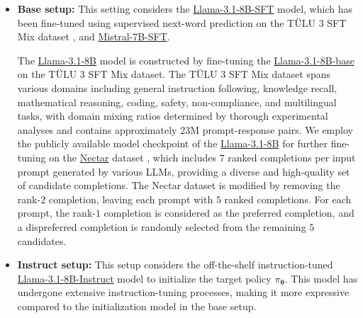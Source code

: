 \begin{itemize}
\item \textbf{Base setup:}
This setting considers the 
\href{https://huggingface.co/allenai/Llama-3.1-Tulu-3-8B-SFT}{Llama-3.1-8B-SFT} model, which has been fine-tuned using supervised next-word prediction on the TÜLU 3 SFT Mix dataset \citep{lambert2024t},
and {\href{https://huggingface.co/HuggingFaceH4/mistral-7b-sft-beta}{Mistral-7B-SFT}}.

The \href{https://huggingface.co/allenai/Llama-3.1-Tulu-3-8B-SFT}{Llama-3.1-8B} model is constructed by fine-tuning the \href{https://huggingface.co/meta-llama/Llama-3.1-8B}{Llama-3.1-8B-base} on the TÜLU 3 SFT Mix dataset. 
The TÜLU 3 SFT Mix dataset spans various domains including general instruction following, knowledge recall, mathematical reasoning, coding, safety, non-compliance, and multilingual tasks, with domain mixing ratios determined by thorough experimental analyses and contains approximately $23$M prompt-response pairs. 
We employ the publicly available model checkpoint of the \href{https://huggingface.co/allenai/Llama-3.1-Tulu-3-8B-SFT}{Llama-3.1-8B} for further fine-tuning on the \href{https://huggingface.co/datasets/berkeley-nest/Nectar}{Nectar} dataset \citep{zhu2023starling}, which includes $7$ ranked completions per input prompt generated by various LLMs, providing a diverse and high-quality set of candidate completions. 
The Nectar dataset is modified by removing the rank-$2$ completion, leaving each prompt with $5$ ranked completions.
For each prompt, the rank-$1$ completion is considered as the preferred completion, and a dispreferred completion is randomly selected from the remaining $5$ candidates.
\item \textbf{Instruct setup:}
This setup considers the off-the-shelf instruction-tuned
\href{https://huggingface.co/meta-llama/Llama-3.1-8B-Instruct}{Llama-3.1-8B-Instruct} model to initialize the target policy $\pi_{\boldsymbol\theta}$.
This model has undergone extensive instruction-tuning processes, making it more expressive compared to the initialization model in the base setup.


\end{itemize}
